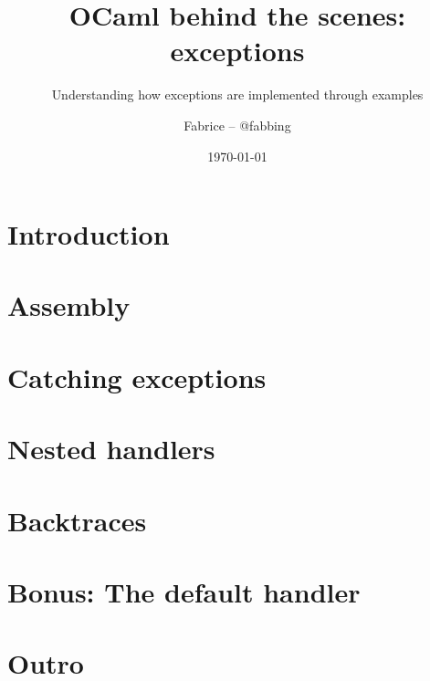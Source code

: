 \documentclass[aspectratio=169,usenames,dvipsnames,8pt,compress]{beamer}
\title[OBTS: exceptions]{OCaml behind the scenes: exceptions}
\subtitle{Understanding how exceptions are implemented through examples}
\author{Fabrice -- @fabbing}
\institute{Tarides}
\date{\today}
\begin{document}
\newcommand{\funcname}[1]{%
\texttt{\textcolor{RoyalBlue}{#1}}%
}

\newcommand{\funcarg}[1]{%
\texttt{\textcolor{Periwinkle}{#1}}%
}

\newcommand{\localname}[1]{%
\texttt{\textcolor{Periwinkle}{#1}}%
}

\newcommand{\typename}[1]{%
\texttt{\textcolor{BrickRed}{#1}}%
}

\newcommand{\regname}[1]{%
  \texttt{\textcolor{Periwinkle}{$\langle$#1$\rangle$}}%
}





\newcommand\frameSubsection[2]{
\begin{frame}
\vfill
\centering
\begin{beamercolorbox}[sep=8pt,center,shadow=true,rounded=true]{title}
  \usebeamerfont{title}\insertsectionhead\par%
  \smallskip
  \usebeamerfont{subtitle}\insertsubsectionhead\par%
\end{beamercolorbox}
\ifthenelse{\equal{#1}{}}{}{
  \smallskip
  \begin{figure}
    \texttt{[image: \#1]}
    \ifthenelse{\equal{#2}{}}{}{
      \caption*{#2}
    }
  \end{figure}
}
\vfill
\end{frame}
}

\newcommand\frameSubsectionTakeaway{%
\frameSubsection{pictures/Trinity.png}{}%
}


\begin{frame}
  \titlepage
\end{frame}

\section*{Introduction}


\section{Assembly}


\section{Catching exceptions}


\section{Nested handlers}


\section{Backtraces}


\section{Bonus: The default handler}


\section*{Outro}

\end{document}
